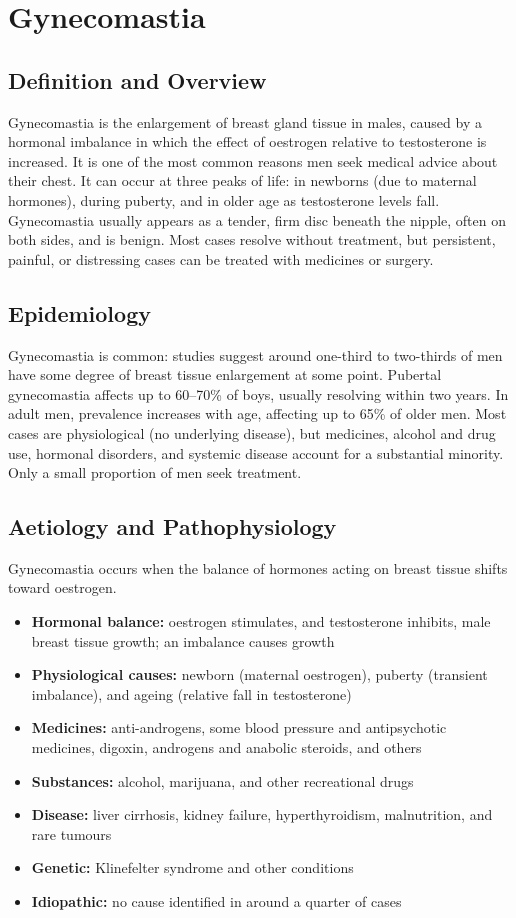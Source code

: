 \chapter{Gynecomastia}

\section*{Definition and Overview}
Gynecomastia is the enlargement of breast gland tissue in males, caused by a hormonal imbalance in which the effect of oestrogen relative to testosterone is increased. It is one of the most common reasons men seek medical advice about their chest. It can occur at three peaks of life: in newborns (due to maternal hormones), during puberty, and in older age as testosterone levels fall. Gynecomastia usually appears as a tender, firm disc beneath the nipple, often on both sides, and is benign. Most cases resolve without treatment, but persistent, painful, or distressing cases can be treated with medicines or surgery.

\section*{Epidemiology}
Gynecomastia is common: studies suggest around one-third to two-thirds of men have some degree of breast tissue enlargement at some point. Pubertal gynecomastia affects up to 60--70\% of boys, usually resolving within two years. In adult men, prevalence increases with age, affecting up to 65\% of older men. Most cases are physiological (no underlying disease), but medicines, alcohol and drug use, hormonal disorders, and systemic disease account for a substantial minority. Only a small proportion of men seek treatment.

\section*{Aetiology and Pathophysiology}
Gynecomastia occurs when the balance of hormones acting on breast tissue shifts toward oestrogen.

\begin{itemize}
    \item \textbf{Hormonal balance:} oestrogen stimulates, and testosterone inhibits, male breast tissue growth; an imbalance causes growth
    \item \textbf{Physiological causes:} newborn (maternal oestrogen), puberty (transient imbalance), and ageing (relative fall in testosterone)
    \item \textbf{Medicines:} anti-androgens, some blood pressure and antipsychotic medicines, digoxin, androgens and anabolic steroids, and others
    \item \textbf{Substances:} alcohol, marijuana, and other recreational drugs
    \item \textbf{Disease:} liver cirrhosis, kidney failure, hyperthyroidism, malnutrition, and rare tumours
    \item \textbf{Genetic:} Klinefelter syndrome and other conditions
    \item \textbf{Idiopathic:} no cause identified in around a quarter of cases
\end{itemize}

